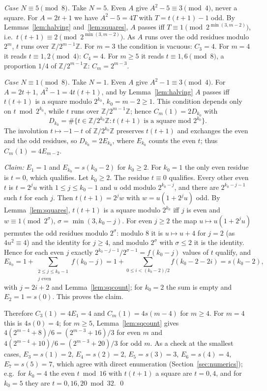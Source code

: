 \documentclass[11pt]{amsart}
\theoremstyle{remark}
\newcommand{\Z}{\mathbb{Z}}
\begin{document}
\emph{Case $N\equiv5\pmod8$.} Take $N=5$. Even $A$ give $A^2-5\equiv3\pmod4$, never a square. For $A=2t+1$ we have $A^2-5=4T$ with $T=t(t+1)-1$ odd. By Lemmas~\ref{lem:halving} and~\ref{lem:squares}, $A$ passes iff $T\equiv1\pmod{2^{\min(3,m-2)}}$, i.e.\ $t(t+1)\equiv2\pmod{2^{\min(3,m-2)}}$. As $A$ runs over the odd residues modulo $2^m$, $t$ runs over $\Z/2^{m-1}\Z$. For $m=3$ the condition is vacuous: $C_3=4$. For $m=4$ it reads $t\equiv1,2\pmod4$: $C_4=4$. For $m\ge5$ it reads $t\equiv1,6\pmod8$, a proportion $1/4$ of $\Z/2^{m-1}\Z$: $C_m=2^{m-3}$.

\emph{Case $N\equiv1\pmod8$.} Take $N=1$. Even $A$ give $A^2-1\equiv3\pmod4$. For $A=2t+1$, $A^2-1=4t(t+1)$, and by Lemma~\ref{lem:halving} $A$ passes iff $t(t+1)$ is a square modulo $2^{k_0}$, $k_0=m-2\ge1$. This condition depends only on $t\bmod 2^{k_0}$, while $t$ runs over $\Z/2^{m-1}\Z$; hence $C_m(1)=2D_{k_0}$ with
\[
D_{k_0}=\#\{t\in\Z/2^{k_0}\Z : t(t+1) \text{ is a square mod } 2^{k_0}\}.
\]
The involution $t\mapsto-1-t$ of $\Z/2^{k_0}\Z$ preserves $t(t+1)$ and exchanges the even and the odd residues, so $D_{k_0}=2E_{k_0}$, where $E_{k_0}$ counts the even $t$; thus $C_m(1)=4E_{m-2}$.

\emph{Claim:} $E_1=1$ and $E_{k_0}=s(k_0-2)$ for $k_0\ge2$. For $k_0=1$ the only even residue is $t=0$, which qualifies. Let $k_0\ge2$. The residue $t\equiv0$ qualifies. Every other even $t$ is $t=2^ju$ with $1\le j\le k_0-1$ and $u$ odd modulo $2^{k_0-j}$, and there are $2^{k_0-j-1}$ such $t$ for each $j$. Then $t(t+1)=2^jw$ with $w=u(1+2^ju)$ odd. By Lemma~\ref{lem:squares}, $t(t+1)$ is a square modulo $2^{k_0}$ iff $j$ is even and $w\equiv1\pmod{2^{\sigma}}$, $\sigma=\min(3,k_0-j)$. For even $j\ge2$ the map $u\mapsto u(1+2^ju)$ permutes the odd residues modulo $2^\sigma$: modulo $8$ it is $u\mapsto u+4$ for $j=2$ (as $4u^2\equiv4$) and the identity for $j\ge4$, and modulo $2^\sigma$ with $\sigma\le2$ it is the identity. Hence for each even $j$ exactly $2^{k_0-j-1}/2^{\sigma-1}=f(k_0-j)$ values of $t$ qualify, and
\[
E_{k_0}=1+\sum_{\substack{2\le j\le k_0-1\\ j\text{ even}}} f(k_0-j)=1+\sum_{0\le i<(k_0-2)/2}f(k_0-2-2i)=s(k_0-2),
\]
with $j=2i+2$ and Lemma~\ref{lem:sqcount}; for $k_0=2$ the sum is empty and $E_2=1=s(0)$. This proves the claim.

Therefore $C_3(1)=4E_1=4$ and $C_m(1)=4s(m-4)$ for $m\ge4$. For $m=4$ this is $4s(0)=4$; for $m\ge5$, Lemma~\ref{lem:sqcount} gives $4(2^{m-4}+8)/6=(2^{m-3}+16)/3$ for even $m$ and $4(2^{m-4}+10)/6=(2^{m-3}+20)/3$ for odd $m$. As a check at the smallest cases, $E_3=s(1)=2$, $E_4=s(2)=2$, $E_5=s(3)=3$, $E_6=s(4)=4$, $E_7=s(5)=7$, which agree with direct enumeration (Section~\ref{sec:numerics}); e.g.\ for $k_0=4$ the even $t\bmod 16$ with $t(t+1)$ a square are $t=0,4$, and for $k_0=5$ they are $t=0,16,20\bmod 32$. \qed
\end{document}

